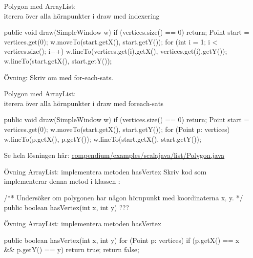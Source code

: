 \begin{Slide}{Polygon med ArrayList: \\iterera över alla hörnpunkter i draw med indexering}
\begin{Code}[numberstyle=,language=Java]
    public void draw(SimpleWindow w) {
        if (vertices.size() == 0) {
            return;
        }
        Point start = vertices.get(0);
        w.moveTo(start.getX(), start.getY());
        for (int i = 1; i < vertices.size(); i++) {
            w.lineTo(vertices.get(i).getX(),
                     vertices.get(i).getY());
        }
        w.lineTo(start.getX(), start.getY());
    }
\end{Code}

Övning: Skriv om med for-each-sats.
\end{Slide}

\begin{Slide}{Polygon med ArrayList: \\iterera över alla hörnpunkter i draw med foreach-sats}
\begin{Code}[numberstyle=,language=Java]
    public void draw(SimpleWindow w) {
        if (vertices.size() == 0) {
            return;
        }
        Point start = vertices.get(0);
        w.moveTo(start.getX(), start.getY());
        for (Point p: vertices){
            w.lineTo(p.getX(), p.getY());
        }
        w.lineTo(start.getX(), start.getY());
    }
\end{Code}

Se hela lösningen här:
\href{https://github.com/lunduniversity/introprog/tree/master/compendium/examples/scalajava/list/Polygon.java}{compendium/examples/scalajava/list/Polygon.java}
\end{Slide}




\begin{Slide}{Övning ArrayList: implementera metoden hasVertex}
Skriv kod som implementerar denna metod i klassen :
\begin{Code}[numberstyle=,language=Java]
/** Undersöker om polygonen har någon hörnpunkt med koordinaterna x, y. */
public boolean hasVertex(int x, int y) {
    ???
}
\end{Code}
\end{Slide}

\begin{Slide}{Övning ArrayList: implementera metoden hasVertex}
\begin{Code}[numberstyle=,language=Java]
    public boolean hasVertex(int x, int y) {
        for (Point p: vertices) {
            if (p.getX() == x && p.getY() == y) {
                return true;
            }
        }
        return false;
    }
\end{Code}
\end{Slide}


